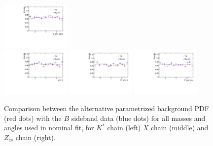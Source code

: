 \begin{figure}[!hbtp]
\includegraphics[width=0.3\textwidth]{Figures/03_Zcs/app_sideband/Z_phi_Zphi.pdf}\\
\includegraphics[width=0.3\textwidth]{Figures/03_Zcs/app_sideband/phi_K.pdf} %
\includegraphics[width=0.3\textwidth]{Figures/03_Zcs/app_sideband/X_phi_K.pdf}%
\includegraphics[width=0.3\textwidth]{Figures/03_Zcs/app_sideband/Z_phi_mu.pdf}\\
\caption{Comparison between the alternative parametrized background PDF (red dots) with the $B$ sideband data (blue dots) for all masses and angles used in nominal fit, for $K^*$ chain (left) $X$ chain (middle) and $Z_{cs}$ chain (right).}
\label{fig:mass_distribution_phi_sideband_3}
\end{figure}






